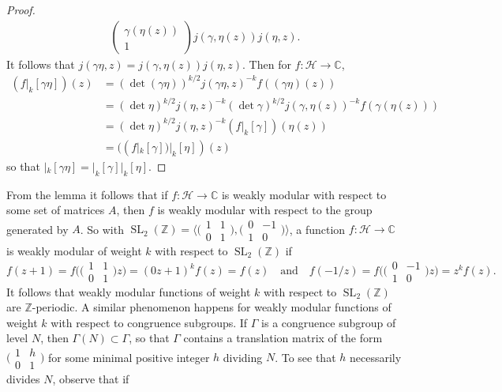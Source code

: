 \documentclass[10pt,leqno,twoside]{article}
\theoremstyle{plain}
\theoremstyle{definition}
\numberwithin{equation}{section}
\numberwithin{lem}{section}
\DeclareMathOperator{\SL}{SL}
\newcommand{\slz}{\SL_2(\mathbb{Z})}
\begin{document}
\begin{proof}
\begin{align*}
\begin{pmatrix}
            \gamma(\eta(z)) \\ 1
        \end{pmatrix}j(\gamma,\eta(z))j(\eta,z).
    \end{align*} 
    It follows that $j(\gamma\eta,z) = j(\gamma,\eta(z))j(\eta,z)$.
    Then for $f\colon \mathcal H\to \mathbb C$,
    \begin{align*}
        (f|_k[\gamma\eta])(z) &= (\det(\gamma\eta))^{k/2}j(\gamma\eta,z)^{-k}f((\gamma\eta)(z))\\
        &= (\det \eta)^{k/2}j(\eta,z)^{-k}(\det \gamma)^{k/2}j(\gamma,\eta(z))^{-k}f(\gamma(\eta(z)))\\
        &= (\det \eta)^{k/2}j(\eta,z)^{-k}(f|_k[\gamma])(\eta(z))\\
        &= ((f|_k[\gamma])|_k[\eta])(z)
    \end{align*} so that $|_k[\gamma\eta] = |_k[\gamma]|_k[\eta]$.
\end{proof}
From the lemma it follows that if $f\colon \mathcal H\to\mathbb C$ is weakly modular with respect to some set of matrices $A$, then $f$ is weakly modular with respect to the group generated by $A$. So with $\slz = \big\langle\big(\!\begin{smallmatrix}
    1 & 1 \\ 0 & 1
\end{smallmatrix}\!\big), \big(\!\begin{smallmatrix}
    0 & -1 \\ 1 & 0
\end{smallmatrix}\!\big)\big\rangle$, a function $f\colon \mathcal H\to \mathbb C$ is weakly modular of weight $k$ with respect to $\slz$ if
\begin{equation}\label{eqn: periodicity slz}
    f(z+1) = f\big(\big(\!\begin{smallmatrix}
        1 & 1 \\ 0 & 1
    \end{smallmatrix}\!\big)z\big) = (0z+1)^kf(z) = f(z)\quad\text{and}\quad f(-1/z) = f\big(\big(\!\begin{smallmatrix}
        0 & -1 \\ 1 & 0
    \end{smallmatrix}\!\big)z\big) = z^kf(z).
\end{equation} It follows that weakly modular functions of weight $k$ with respect to $\slz$ are $\mathbb Z$-periodic. A similar phenomenon happens for weakly modular functions of weight $k$ with respect to congruence subgroups. If $\varGamma$ is a congruence subgroup of level $N$, then $\varGamma(N)\subset \varGamma$, so that $\varGamma$ contains a translation matrix of the form $\big(\!\begin{smallmatrix}
    1 & h \\ 0 & 1
\end{smallmatrix}\!\big)$ for some minimal positive integer $h$ dividing $N$. To see that $h$ necessarily divides $N$, observe that if 
\end{document}
